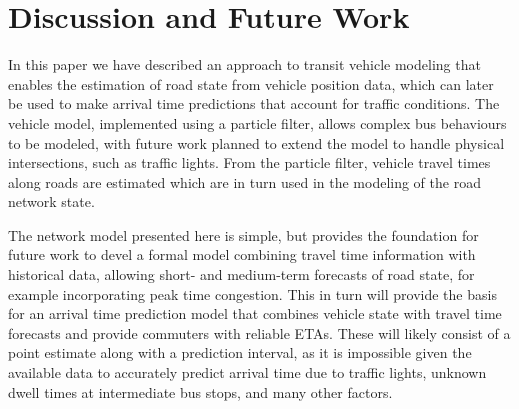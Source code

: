 \section{Discussion and Future Work}
\label{sec:discussion}

In this paper we have described an approach to transit vehicle modeling
that enables the \rt estimation of road state from vehicle position data,
which can later be used to make arrival time predictions
that account for \rt traffic conditions.
The vehicle model, implemented using a particle filter,
allows complex bus behaviours to be modeled,
with future work planned to extend the model to handle physical intersections,
such as traffic lights.
From the particle filter,
vehicle travel times along roads are estimated which are in turn used 
in the modeling of the road network state.


The network model presented here is simple,
but provides the foundation for future work to
devel a formal model combining \rt travel time information with historical data, 
allowing short- and medium-term forecasts of road state,
for example incorporating peak time congestion.
This in turn will provide the basis for an arrival time prediction model
that combines \rt vehicle state with travel time forecasts
and provide commuters with reliable ETAs.
These will likely consist of a point estimate along with a prediction interval,
as it is impossible given the available data to accurately predict arrival time
due to traffic lights, unknown dwell times at intermediate bus stops,
and many other factors.








